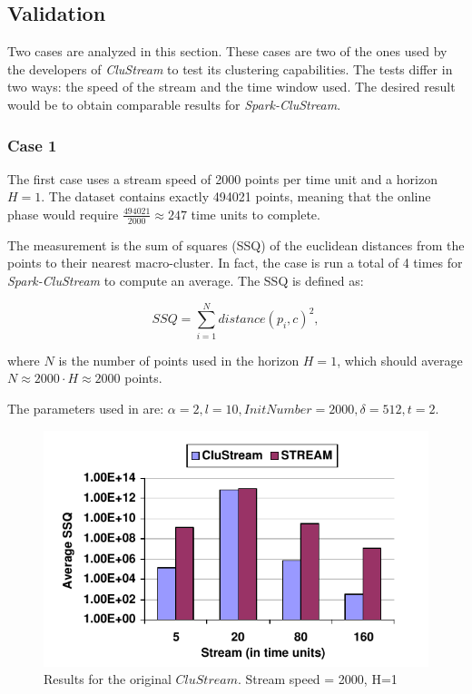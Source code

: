 \documentclass{llncs}
\begin{document}
\subsection{Validation}


Two cases are analyzed in this section. These cases are two of the ones used by the developers of \textit{CluStream} to test its clustering capabilities. The tests differ in two ways: the speed of the stream and the time window used. The desired result would be to obtain comparable results for \textit{Spark-CluStream}.

\subsubsection{Case 1}

The first case uses a stream speed of 2000 points per time unit and a horizon $H=1$. The dataset contains exactly 494021 points, meaning that the online phase would require $\frac{494021}{2000} \approx 247$ time units to complete.

The measurement is the sum of squares (SSQ) of the euclidean distances from the points to their nearest macro-cluster. In fact, the case is run a total of 4 times for \textit{Spark-CluStream} to compute an average. The SSQ is defined as:

\begin{equation}
 SSQ = \sum_{i=1}^N distance(p_i,c)^2,
\end{equation}

where $N$ is the number of points used in the horizon $H=1$, which should average $N \approx 2000\cdot H \approx 2000$ points.

The parameters used in \cite{clustreamOrig} are: $\alpha=2,l=10,InitNumber=2000,\delta=512,t=2$.

\begin{figure}[h]
 \centering
 \includegraphics[scale=0.6]{./styles/2000h1-orig.png}
 \caption{Results for the original $CluStream$\cite{clustreamOrig}. Stream speed = 2000, H=1}
 \label{fig:2000orig}
\end{figure}
\end{document}
